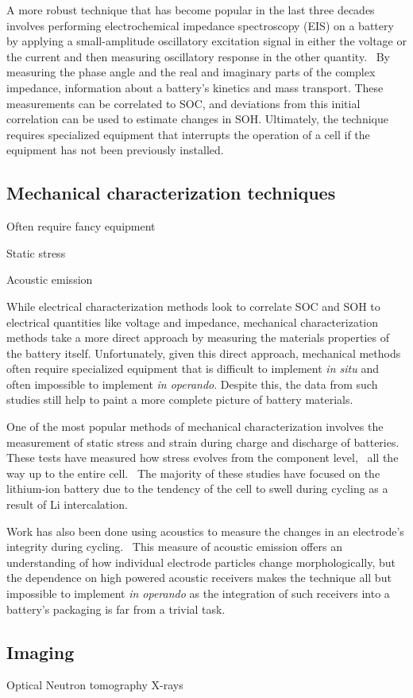A more robust technique that has become popular in the last three decades involves performing electrochemical impedance spectroscopy (EIS) on a battery by applying a small-amplitude oscillatory excitation signal in either the voltage or the current and then measuring oscillatory response in the other quantity.~\cite{Huet_undated-ik} By measuring the phase angle and the real and imaginary parts of the complex impedance, information about a battery's kinetics and mass transport. These measurements can be correlated to SOC, and deviations from this initial correlation can be used to estimate changes in SOH. Ultimately, the technique requires specialized equipment that interrupts the operation of a cell if the equipment has not been previously installed.  

\subsection{Mechanical characterization techniques}

Often require fancy equipment

Static stress

Acoustic emission

While electrical characterization methods look to correlate SOC and SOH to electrical quantities like voltage and impedance, mechanical characterization methods take a more direct approach by measuring the materials properties of the battery itself. Unfortunately, given this direct approach, mechanical methods often require specialized equipment that is difficult to implement \textit{in situ} and often impossible to implement \textit{in operando}. Despite this, the data from such studies still help to paint a more complete picture of battery materials.

One of the most popular methods of mechanical characterization involves the measurement of static stress and strain during charge and discharge of batteries. These tests have measured how stress evolves from the component level,~\cite{cannarella_ion,peabody_separator, chen,du_cycling,han,park,striebel} all the way up to the entire cell.~\cite{cannarella_stress,Fu2013-yr,Oh2014-pc} The majority of these studies have focused on the lithium-ion battery due to the tendency of the cell to swell during cycling as a result of Li intercalation.

Work has also been done using acoustics to measure the changes in an electrode's integrity during cycling.~\cite{Kircheva2011-ji, Komagata2010-sw, etiemble, Didier-Laurent2008-tt} This measure of acoustic emission offers an understanding of how individual electrode particles change morphologically, but the dependence on high powered acoustic receivers makes the technique all but impossible to implement \textit{in operando} as the integration of such receivers into a battery's packaging is far from a trivial task. 

\subsection{Imaging}

Optical
Neutron tomography
X-rays


